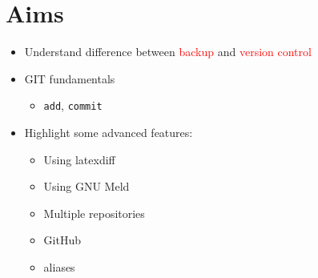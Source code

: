 \documentclass[a4paper,12pt]{article}
\newcommand{\ALERT}[1]{\textcolor{red}{#1}}
\newcommand{\CMD}[1]{\texttt{#1}}
\begin{document}
\section{Aims}
\label{sec:aims}

\begin{itemize}
\item Understand difference between \ALERT{backup} and \ALERT{version
    control}
\item GIT fundamentals
  \begin{itemize}
  \item \CMD{add}, \CMD{commit}
  \end{itemize}
\item Highlight some advanced features:
  \begin{itemize}
  \item Using latexdiff
  \item Using GNU Meld
  \item Multiple repositories
  \item GitHub
  \item aliases
  \end{itemize}
\end{itemize}
\end{document}
